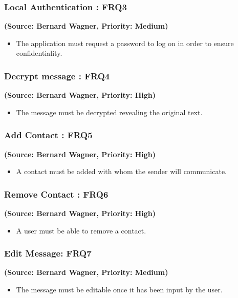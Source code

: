 \subsubsection{Local Authentication : FRQ3}%
\textbf{(Source: Bernard Wagner, Priority: Medium)}
\begin{itemize}
\item The application must request a password to log on in order to ensure confidentiality.
\end{itemize}
\subsubsection{Decrypt message : FRQ4}
\textbf{(Source: Bernard Wagner, Priority: High)}
\begin{itemize}
\item The message must be decrypted revealing the original text.
\end{itemize}
\subsubsection{Add Contact : FRQ5}
\textbf{(Source: Bernard Wagner, Priority: High)}
\begin{itemize}
\item A contact must be added with whom the sender will communicate.
\end{itemize}
\subsubsection{Remove Contact : FRQ6}
\textbf{(Source: Bernard Wagner, Priority: High)}
\begin{itemize}
\item A user must be able to remove a contact.
\end{itemize}
\subsubsection{Edit Message: FRQ7}
\textbf{(Source: Bernard Wagner, Priority: Medium)}
\begin{itemize}
\item The message must be editable once it has been input by the user.
\end{itemize}
